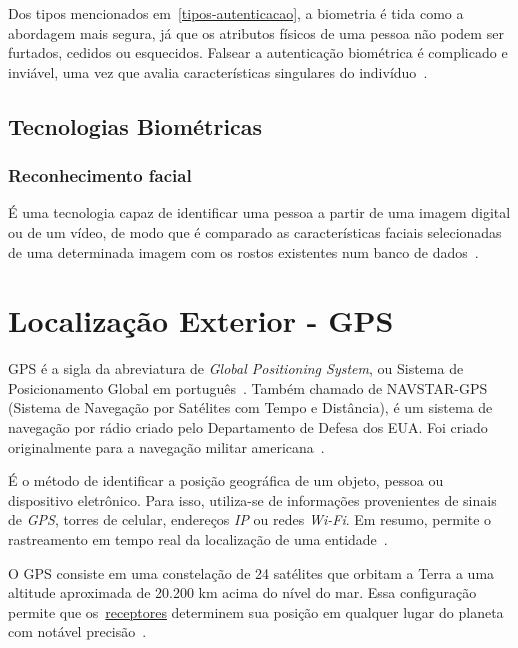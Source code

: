 Dos tipos mencionados em~\ref{tipos-autenticacao}, a biometria é tida como a abordagem mais segura, já que os atributos físicos de uma pessoa não podem ser furtados, cedidos ou esquecidos.
Falsear a autenticação biométrica é complicado e inviável, uma vez que avalia características singulares do indivíduo~\cite{dos2019tecnologias}.

\subsection{Tecnologias Biométricas}\label{subsec:biometria-tecnologias}

\subsubsection{Reconhecimento facial}\label{subsubsec:reconhecimento-facial}
É uma tecnologia capaz de identificar uma pessoa a partir de uma imagem digital ou de um vídeo, de modo que é comparado as características faciais selecionadas de uma determinada imagem com os rostos existentes num banco de dados~\cite{orvalho2019reconhecimento}.




\section{Localização Exterior - GPS}\label{sec:localizacao}
GPS é a sigla da abreviatura de \textit{Global Positioning System}, ou Sistema de Posicionamento Global em português~\cite{gpsdesigning}.
Também chamado de NAVSTAR-GPS (Sistema de Navegação por Satélites com Tempo e Distância), é um sistema de navegação por rádio criado pelo Departamento de Defesa dos EUA. Foi criado originalmente para a navegação militar americana~\cite{novais2014localizaccao}.

É o método de identificar a posição geográfica de um objeto, pessoa ou dispositivo eletrônico.
Para isso, utiliza-se de informações provenientes de sinais de \hypertarget{receptores}{ \textit{GPS}, torres de celular, endereços \textit{IP} ou redes  \textit{Wi-Fi}}.
Em resumo, permite o rastreamento em tempo real da localização de uma entidade~\cite{da2019sistemas}.

O GPS consiste em uma constelação de 24 satélites que orbitam a Terra a uma altitude aproximada de 20.200 km acima do nível do mar.
Essa configuração permite que os~\hyperlink{receptores}{receptores} determinem sua posição em qualquer lugar do planeta com notável precisão~\cite{el2002introduction}.

